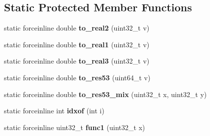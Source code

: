 \subsection*{\-Static \-Protected \-Member \-Functions}
\begin{DoxyCompactItemize}
\item 
\hypertarget{classsfmtplus_1_1sse2__fast__mersenne__twister_a1bce89f383305ef6554a1317d944974c}{
static forceinline double {\bfseries to\-\_\-real2} (uint32\-\_\-t v)}
\label{classsfmtplus_1_1sse2__fast__mersenne__twister_a1bce89f383305ef6554a1317d944974c}

\item 
\hypertarget{classsfmtplus_1_1sse2__fast__mersenne__twister_a0956cfc8b1997e608c256d82f2fdece4}{
static forceinline double {\bfseries to\-\_\-real1} (uint32\-\_\-t v)}
\label{classsfmtplus_1_1sse2__fast__mersenne__twister_a0956cfc8b1997e608c256d82f2fdece4}

\item 
\hypertarget{classsfmtplus_1_1sse2__fast__mersenne__twister_a2c1101fda53bcdb5b7cef81225fdea90}{
static forceinline double {\bfseries to\-\_\-real3} (uint32\-\_\-t v)}
\label{classsfmtplus_1_1sse2__fast__mersenne__twister_a2c1101fda53bcdb5b7cef81225fdea90}

\item 
\hypertarget{classsfmtplus_1_1sse2__fast__mersenne__twister_a4a8c1c46d3293956c29387f3a6f6c8c8}{
static forceinline double {\bfseries to\-\_\-res53} (uint64\-\_\-t v)}
\label{classsfmtplus_1_1sse2__fast__mersenne__twister_a4a8c1c46d3293956c29387f3a6f6c8c8}

\item 
\hypertarget{classsfmtplus_1_1sse2__fast__mersenne__twister_a8d13b15adf90a8e807fa1b9144f10bc9}{
static forceinline double {\bfseries to\-\_\-res53\-\_\-mix} (uint32\-\_\-t x, uint32\-\_\-t y)}
\label{classsfmtplus_1_1sse2__fast__mersenne__twister_a8d13b15adf90a8e807fa1b9144f10bc9}

\item 
\hypertarget{classsfmtplus_1_1sse2__fast__mersenne__twister_adfc85e9faef84d6033a8c41ad82e2cdb}{
static forceinline int {\bfseries idxof} (int i)}
\label{classsfmtplus_1_1sse2__fast__mersenne__twister_adfc85e9faef84d6033a8c41ad82e2cdb}

\item 
\hypertarget{classsfmtplus_1_1sse2__fast__mersenne__twister_ad86f85cc4f42617d7dbd40bc7c1878eb}{
static forceinline uint32\-\_\-t {\bfseries func1} (uint32\-\_\-t x)}
\label{classsfmtplus_1_1sse2__fast__mersenne__twister_ad86f85cc4f42617d7dbd40bc7c1878eb}


\end{DoxyCompactItemize}
